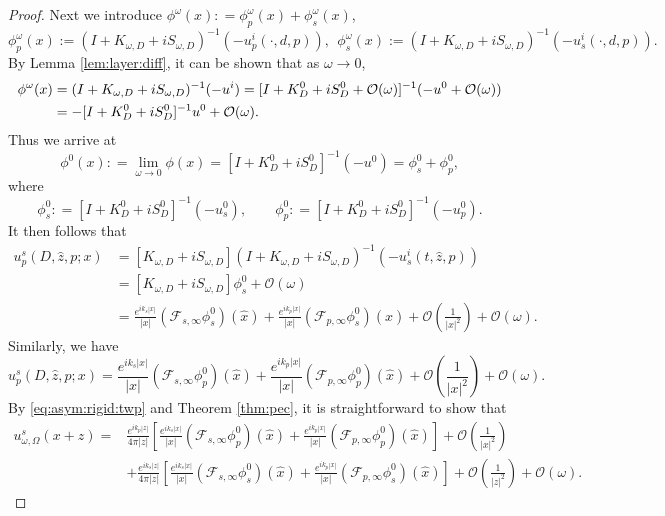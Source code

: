 \documentclass[a4paper,11pt]{article}
\newcommand{\mO}{\mathcal{O}}
\theoremstyle{remark}
\theoremstyle{definition}
\numberwithin{equation}{section}
\begin{document}
\begin{proof}
Next we introduce $\phi^{\omega}(x) : = \phi_{p}^{\omega}(x) + \phi_{s}^{\omega}(x)$,
\[
\phi_{p}^{\omega}(x) := (I + K_{\omega, D} + i S_{\omega, D})^{-1}(-u_{p}^{i}(\cdot, d,p)), \ \ \phi_{s}^{\omega}(x) := (I + K_{\omega, D} + i S_{\omega, D})^{-1}(-u_{s}^{i}(\cdot, d,p)).
\]
By Lemma \ref{lem:layer:diff}, it can be shown that as $\omega \rightarrow 0$,
\begin{align}
\phi^{\omega}(x) &= (I + K_{\omega, D} + i S_{\omega, D})^{-1}(-u^{i})  =   [I + K_{D}^{0} + i S_{D}^{0} + \mathcal{O}(\omega)]^{-1}(-u^0 + \mathcal{O}(\omega)) \notag \\
        &= -[I + K_{D}^{0} + i S_{D}^{0}]^{-1}u^0 + \mathcal{O}(\omega). \label{eq:}
\end{align}
Thus we arrive at
\[
\phi^{0}(x): = \lim_{\omega \rightarrow 0}\phi(x) =  [I + K_{D}^{0} + i S_{D}^{0}]^{-1}(-u^0)= \phi_{s}^0+ \phi_{p}^0,
\]
where
\begin{equation}\label{eq:phi:u:rela}
\phi_{s}^0: = [I + K_{D}^{0} + i S_{D}^{0}]^{-1}(-u_{s}^0),\quad \quad \phi_{p}^0: = [I + K_{D}^{0} + i S_{D}^{0}]^{-1}(- u_{p}^0).
\end{equation}
It then follows that
\begin{align*}
u_{p}^s(D,\hat{z},p;x) &= [K_{\omega,D} + iS_{\omega,D}]  (I + K_{\omega,D} + i S_{\omega,D})^{-1}(- u_{s}^{i}(t,\hat{z},p)) \\
& = [K_{\omega,D} + iS_{\omega,D}]\phi_{s}^0 + \mO(\omega) \\
&= \frac{e^{ik_s|x|}}{|x|} (\mathcal{F}_{s,\infty}\phi_{s}^0)(\hat{x}) + \frac{e^{ik_p|x|}}{|x|} (\mathcal{F}_{p,\infty}\phi_{s}^0)(\hat{x})+ \mathcal{O}(\frac{1}{|x|^2}) + \mO(\omega).
\end{align*}
Similarly, we have
\begin{equation}
u_{p}^s(D,\hat{z},p;x) =  \frac{e^{ik_s|x|}}{|x|} (\mathcal{F}_{s,\infty}\phi_{p}^0)(\hat{x}) + \frac{e^{ik_p|x|}}{|x|} (\mathcal{F}_{p,\infty}\phi_{p}^0)(\hat{x})+ \mathcal{O}(\frac{1}{|x|^2}) + \mO(\omega).
\end{equation}
By \eqref{eq:asym:rigid:twp} and Theorem \ref{thm:pec}, it is straightforward to show that
\begin{align*}
 u_{\omega,\Omega}^s(x+z)  =& \frac{e^{ik_p|z|}}{4 \pi |z|} \left[ \frac{e^{ik_s|x|}}{|x|} (\mathcal{F}_{s,\infty}\phi_{p}^0)(\hat{x}) + \frac{e^{ik_p|x|}}{|x|} (\mathcal{F}_{p,\infty}\phi_{p}^0)(\hat{x})\right] + \mathcal{O}(\frac{1}{|x|^2}) \\
 &+\frac{e^{ik_s|z|}}{4 \pi |z|} \left[ \frac{e^{ik_s|x|}}{|x|} (\mathcal{F}_{s,\infty}\phi_{s}^0)(\hat{x}) + \frac{e^{ik_p|x|}}{|x|} (\mathcal{F}_{p,\infty}\phi_{s}^0)(\hat{x})\right] + \mO(\frac{1}{|z|^2}) + \mO(\omega).

\end{align*}
\end{proof}
\end{document}
